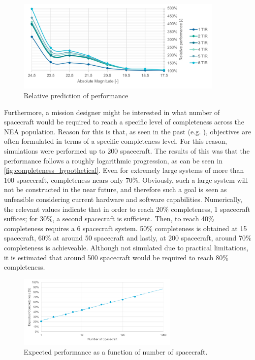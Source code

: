 \begin{figure}[htbp]
 \centering
 \includegraphics[width=0.9\textwidth]{img/performance_prediction_rel.pdf}
 \caption{Relative prediction of performance}
 \label{fig:performance_prediction_rel}
\end{figure}

Furthermore, a mission designer might be interested in what number of spacecraft would be required to reach a specific level of completeness across the NEA population. Reason for this is that, as seen in the past (e.g. \cite{2003NEOSDT}), objectives are often formulated in terms of a specific completeness level. For this reason, simulations were performed up to 200 spacecraft. The results of this was that the performance follows a roughly logarithmic progression, as can be seen in \autoref{fig:completeness_hypothetical}. Even for extremely large systems of more than 100 spacecraft, completeness nears only 70\%. Obviously, such a large system will not be constructed in the near future, and therefore such a goal is seen as unfeasible considering current hardware and software capabilities. Numerically, the relevant values indicate that in order to reach 20\% completeness, 1 spacecraft suffices; for 30\%, a second spacecraft is sufficient. Then, to reach 40\% completeness requires a 6 spacecraft system. 50\% completeness is obtained at 15 spacecraft, 60\% at around 50 spacecraft and lastly, at 200 spacecraft, around 70\% completeness is achieveable. Although not simulated due to practical limitations, it is estimated that around 500 spacecraft would be required to reach 80\% completeness.

\begin{figure}[htbp]
 \centering
 \includegraphics[width=0.7\textwidth]{img/completeness_hypothetical.pdf}
 \caption{Expected performance as a function of number of spacecraft.}
 \label{fig:completeness_hypothetical}
\end{figure}

